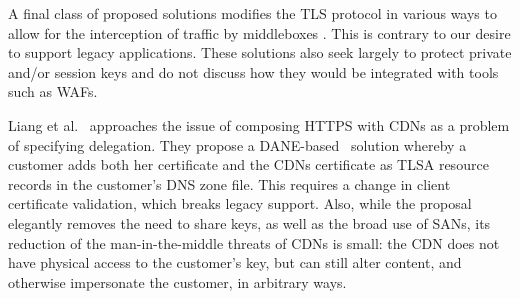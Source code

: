 A final class of proposed solutions modifies the TLS protocol in various ways
to allow for the interception of traffic by middleboxes
\cite{naylor2015multi,naylor2017and,leematls}.  This is contrary to our desire
to support legacy applications.  These solutions also seek largely to protect
private and/or session keys and do not discuss how they would be integrated
with tools such as WAFs.

%

Liang et al.~\cite{when-https-meets-cdn} approaches the issue of composing
HTTPS with CDNs as a problem of specifying delegation.  
%
%
They propose a DANE-based~\cite{DANE} solution whereby a customer adds both
her certificate and the CDNs certificate as TLSA resource records in the
customer's DNS zone file.  This requires a change in client certificate validation, which breaks legacy support.
%
%
Also, while the proposal elegantly removes the need to share keys, as well as the
broad use of SANs, its reduction of the man-in-the-middle threats of
CDNs is small: the CDN does not have physical access to the customer's key,
but can still alter content, and otherwise impersonate the customer, in
arbitrary ways.  
%

